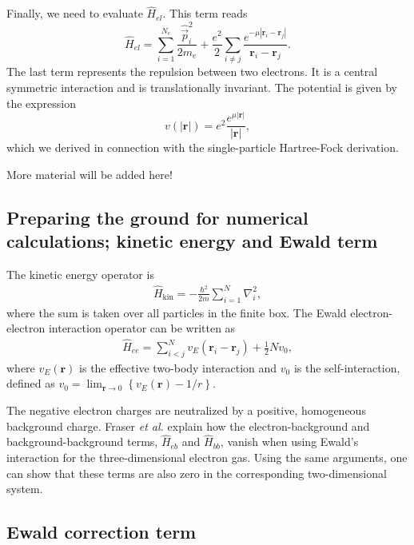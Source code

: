 \documentclass[%
oneside,                 %
final,                   %
10pt]{article}
\newenvironment{doconceexercise}{}{}
\begin{document}
\begin{doconceexercise}
Finally, we need to evaluate $\hat H_{el}$. This term reads
\[ 
\hat H_{el} = \sum_{i=1}^{N_e} \frac{\hat{\vec p}_i^2}{2m_e} + \frac{e^2}{2} \sum_{i \neq j} \frac{e^{-\mu |\mathbf{r}_i - \mathbf{r}_j|}}{\mathbf{r}_i - \mathbf{r}_j} . 
\]
The last term represents the repulsion between two electrons. It is a central symmetric interaction
and is translationally invariant. The potential is given by the expression
\[ 
v(|\mathbf{r}|) = e^2 \frac{e^{\mu|\mathbf{r}|}}{|\mathbf{r}|}, 
\]
which we derived in connection with the single-particle Hartree-Fock derivation.

More material will be added here!





\end{doconceexercise}


\subsection*{Preparing the ground for numerical calculations; kinetic energy and Ewald term}

The kinetic energy operator is
\begin{align}
  \hat{H}_{\text{kin}} = -\frac{\hbar^{2}}{2m}\sum_{i=1}^{N}\nabla_{i}^{2},
\end{align}
where the sum is taken over all particles in the finite
box. The Ewald electron-electron interaction operator 
can be written as 
\begin{align}
  \hat{H}_{ee} = \sum_{i < j}^{N} v_{E}\left( \mathbf{r}_{i}-\mathbf{r}_{j}\right)
  + \frac{1}{2}Nv_{0},
\end{align}
where $v_{E}(\mathbf{r})$ is the effective two-body 
interaction and $v_{0}$ is the self-interaction, defined 
as $v_{0} = \lim_{\mathbf{r} \rightarrow 0} \left\{ v_{E}(\mathbf{r}) - 1/r\right\} $. 

The negative 
electron charges are neutralized by a positive, homogeneous 
background charge. Fraser \emph{et al.} explain how the
electron-background and background-background terms, 
$\hat{H}_{eb}$ and $\hat{H}_{bb}$, vanish
when using Ewald's interaction for the three-dimensional
electron gas. Using the same arguments, one can show that
these terms are also zero in the corresponding 
two-dimensional system. 




\subsection*{Ewald correction term}
\end{document}
